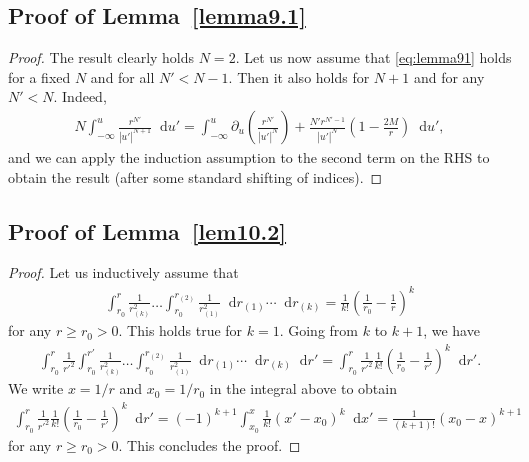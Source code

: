 \documentclass[11pt,english]{article}
\numberwithin{equation}{section}
\theoremstyle{remark}
\theoremstyle{plain}
\theoremstyle{remark}
\newcommand{\dd}{\mathop{}\!\mathrm{d}}
\newcommand{\pu}{\partial_u}
\renewcommand{\(}{\left(}
\renewcommand{\)}{\right)}
\begin{document}
\subsection{Proof of Lemma~\ref{lemma9.1}}\label{A3}
\begin{proof}
The result clearly holds $N=2$. Let us now assume that \eqref{eq:lemma91} holds for a fixed $N$ and for all $N'<N-1$. Then it also holds for $N+1$ and for any $N'<N$. Indeed,
\begin{align}
N\int_{-\infty}^u\frac{r^{N'}}{|u'|^{N+1}}\dd u'=\int_{-\infty}^u \pu\left(	\frac{r^{N'}}{|u'|^{N}}	\right) +\frac{N'r^{N'-1}}{|u'|^{N}}\left(1-\frac{2M}{r}\right)\dd u',
\end{align}
and we can apply the induction assumption to the second term on the RHS to obtain the result (after some standard  shifting of indices).
\end{proof}
\subsection{Proof of Lemma~\ref{lem10.2}}\label{A4}
\begin{proof}
Let us inductively assume that
\begin{align}
{\int_{r_0}^{r}\frac{1}{r_{(k)}^2}\dots\int_{r_0}^{r_{(2)}}\frac{1}{r_{(1)}^2}\dd r_{(1)}\cdots\dd r_{(k)}}=\frac{1}{k!}\left(\frac{1}{r_0}-\frac{1}{r}\right)^k
\end{align}
for any $r\geq r_0>0$.
This holds true for $k=1$. Going from $k$ to $k+1$, we have
\begin{align}
{\int_{r_0}^{r}\frac{1}{r'^2}\int_{r_0}^{r'}\frac{1}{r_{(k)}^2}\dots\int_{r_0}^{r_{(2)}}\frac{1}{r_{(1)}^2}\dd r_{(1)}\cdots\dd r_{(k)}\dd r'}=\int_{r_0}^r \frac{1}{r'^2}\frac{1}{k!}\left(\frac{1}{r_0}-\frac{1}{r'}\right)^k\dd r'.
\end{align}
We write $x=1/r$ and $x_0=1/r_0$ in the integral above to obtain
\begin{align}
\int_{r_0}^r \frac{1}{r'^2} \frac{1}{k!}\left(\frac{1}{r_0}-\frac{1}{r'}\right)^k\dd r'=(-1)^{k+1}\int_{x_0}^x \frac{1}{k!}(x'-x_0)^k\dd x'=\frac{1}{(k+1)!}(x_0-x)^{k+1}
\end{align}
for any $r\geq r_0>0$.
This concludes the proof.
\end{proof}
\end{document}
